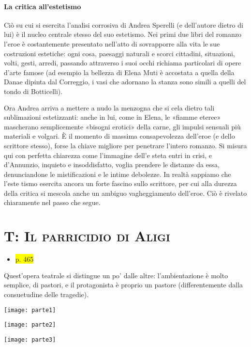 \documentclass{book}
\newcommand{\pagine}[1]{\colorbox{yellow}{#1}}
\begin{document}
\paragraph{La critica all'estetismo} Ciò su cui si esercita l'analisi corrosiva di Andrea Sperelli (e dell'autore dietro di lui) è il nucleo centrale stesso del suo estetismo. Nei primi due libri del romanzo l'eroe è costantemente presentato nell’atto di sovrapporre alla vita le sue costruzioni estetiche: ogni cosa, paesaggi naturali e scorci cittadini, situazioni, volti, gesti, arredi, passando attraverso i suoi occhi richiama particolari di opere d'arte famose (ad esempio la bellezza di Elena Muti è accostata a quella della Danae dipinta dal Correggio, i vasi che adornano la stanza sono simili a quelli del tondo di Botticelli).

Ora Andrea arriva a mettere a nudo la menzogna che si cela dietro tali sublimazioni estetizzanti: anche in lui, come in Elena, le «fiamme eteree» mascherano semplicemente «bisogni erotici» della carne, gli impulsi sensuali più materiali e volgari. È il momento di massima consapevolezza dell'eroe (e dello scrittore stesso), forse la chiave migliore per penetrare l'intero romanzo. Si misura qui con perfetta chiarezza come l'immagine dell'e steta entri in crisi, e d'Annunzio, inquieto e insoddisfatto, voglia prendere le distanze da essa, denunciandone le mistificazioni e le intime debolezze. In realtà sappiamo che l'este tismo esercita ancora un forte fascino sullo scrittore, per cui alla durezza della critica si mescola anche un ambiguo vagheggiamento dell'eroe. Ciò è rivelato chiaramente nel passo che segue.

\section{T: \textsc{Il parricidio di Aligi}}

\begin{itemize}
\item
  \pagine{p. 465}
\end{itemize}

Quest'opera teatrale si distingue un po' dalle altre: l'ambientazione è
molto semplice, di pastori, e il protagonista è proprio un pastore
(differentemente dalla consuetudine delle tragedie).

\texttt{[image: parte1]}

\texttt{[image: parte2]}

\texttt{[image: parte3]}
\end{document}
